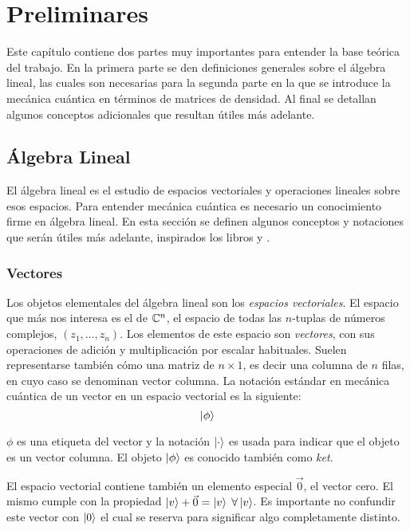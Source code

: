 \chapter{Preliminares}\label{ch:preliminares}

Este capítulo contiene dos partes muy importantes para entender la base teórica del trabajo. En la primera parte se den definiciones generales sobre el álgebra lineal, las cuales son necesarias para la segunda parte en la que se introduce la mecánica cuántica en términos de matrices de densidad.
Al final se detallan algunos conceptos adicionales que resultan útiles más adelante.

\section{Álgebra Lineal}
El álgebra lineal es el estudio de espacios vectoriales y operaciones lineales sobre esos espacios. Para entender mecánica cuántica es necesario un conocimiento firme en álgebra lineal. En esta sección se definen algunos conceptos y notaciones que serán útiles más adelante, inspirados los libros \cite{quantum_computer_science} y \cite{purification}.

\subsection{Vectores}

Los objetos elementales del álgebra lineal son los \emph{espacios vectoriales}. El espacio que más nos interesa es el de $\mathbb{C}^n$, el espacio de todas las $n$-tuplas de números complejos, $(z_1, \dots, z_n)$. Los elementos de este espacio son \emph{vectores}, con sus operaciones de adición y multiplicación por escalar habituales. Suelen representarse también cómo una matriz de $n \times 1$, es decir una columna de $n$ filas, en cuyo caso se denominan vector columna.
La notación estándar en mecánica cuántica de un vector en un espacio vectorial es la siguiente:
\[\ket{\phi}\]

$\phi$ es una etiqueta del vector y la notación $\ket{\cdot}$ es usada para indicar que el objeto es un vector columna. El objeto $\ket{\phi}$ es conocido también como \emph{ket}.

El espacio vectorial contiene también un elemento especial $\vec{0}$, el vector cero. El mismo cumple con la propiedad $\ket{v} + \vec{0} = \ket{v} \;\forall \ket{v}$. Es importante no confundir este vector con $\ket{0}$ el cual se reserva para significar algo completamente distinto.

